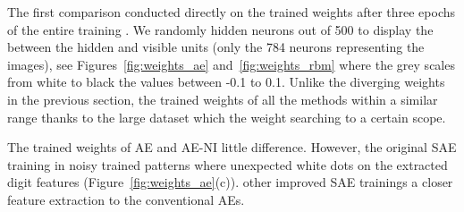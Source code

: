 The first comparison \DIFdelbegin {}\DIFdelend \DIFaddbegin {}\DIFaddend conducted directly on the trained weights after three epochs of the entire training \DIFdelbegin {}\DIFdelend \DIFaddbegin {}\DIFaddend .
We randomly \DIFdelbegin {}\DIFdelend \DIFaddbegin {} hidden neurons out of 500 to display the \DIFdelbegin {}\DIFdelend \DIFaddbegin {}\DIFaddend between the hidden and visible units (only the 784 neurons representing the images), see Figures~\ref{fig:weights_ae} and~\ref{fig:weights_rbm} where the grey scales from white to black \DIFdelbegin {}\DIFdelend \DIFaddbegin {}\DIFaddend the values between -0.1 to 0.1.
Unlike the diverging weights in the previous section, the trained weights of all the methods \DIFdelbegin {}\DIFdelend \DIFaddbegin {}\DIFaddend within a similar range thanks to the large dataset which \DIFdelbegin {}\DIFdelend \DIFaddbegin {}\DIFaddend the weight searching to a certain scope.  



The trained weights of AE and AE-NI \DIFdelbegin {}\DIFdelend \DIFaddbegin {}\DIFaddend little difference.
However, the original SAE training \DIFdelbegin {}\DIFdelend \DIFaddbegin {}\DIFaddend in noisy trained patterns where unexpected white dots \DIFdelbegin {}\DIFdelend \DIFaddbegin {}\DIFaddend on the extracted digit features (Figure~\ref{fig:weights_ae}(c)).
\DIFdelbegin {}\DIFdelend \DIFaddbegin {}\DIFaddend other improved SAE trainings \DIFdelbegin {}\DIFdelend \DIFaddbegin {}\DIFaddend a closer feature extraction to the conventional AEs.



